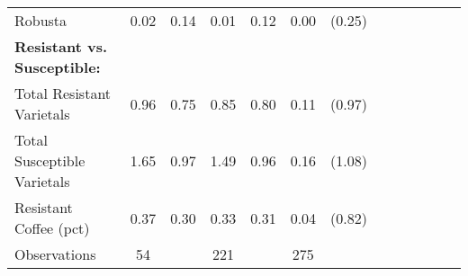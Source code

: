 \begin{table}[htbp]
\begin{tabular}{l*{3}{cccc}}
\addlinespace
Robusta         &     0.02&     0.14&     0.01&     0.12&     0.00         &   (0.25)\\
\addlinespace
\textbf{  Resistant vs. Susceptible:}&         &         &         &         &                  &         \\
\addlinespace
Total Resistant Varietals&     0.96&     0.75&     0.85&     0.80&     0.11         &   (0.97)\\
\addlinespace
Total Susceptible Varietals&     1.65&     0.97&     1.49&     0.96&     0.16         &   (1.08)\\
\addlinespace
Resistant Coffee (pct)&     0.37&     0.30&     0.33&     0.31&     0.04         &   (0.82)\\
\midrule
Observations    &       54&         &      221&         &      275         &         \\
\bottomrule
\end{tabular}
\end{table}
